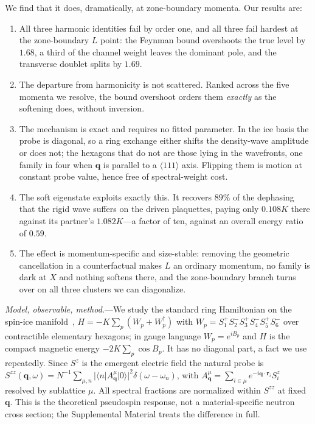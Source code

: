 \documentclass[
aps,prl,twocolumn,amsmath,amssymb,superscriptaddress,
longbibliography,floatfix
]{revtex4-2}
\newcommand{\bq}{\bm q}
\newcommand{\Szz}{S^{zz}}
\begin{document}
We find that it does, dramatically, at zone-boundary momenta. Our results
are:
\begin{enumerate}
\item All three harmonic identities fail by order one, and all three fail
hardest at the zone-boundary $L$ point: the Feynman bound overshoots the
true level by $1.68$, a third of the channel weight leaves the dominant
pole, and the transverse doublet splits by $1.69$.
\item The departure from harmonicity is not scattered. Ranked across the
five momenta we resolve, the bound overshoot orders them \emph{exactly} as
the softening does, without inversion.
\item The mechanism is exact and requires no fitted parameter. In the ice
basis the probe is diagonal, so a ring exchange either shifts the
density-wave amplitude or does not; the hexagons that do not are those
lying in the wavefronts, one family in four when $\bq$ is parallel to a
$\langle111\rangle$ axis. Flipping them is motion at constant probe
value, hence free of spectral-weight cost.
\item The soft eigenstate exploits exactly this. It recovers $89\%$ of the
dephasing that the rigid wave suffers on the driven plaquettes, paying
only $0.108K$ there against its partner's $1.082K$---a factor of ten,
against an overall energy ratio of $0.59$.
\item The effect is momentum-specific and size-stable: removing the
geometric cancellation in a counterfactual makes $L$ an ordinary
momentum, no family is dark at $X$ and nothing softens there, and the
zone-boundary branch turns over on all three clusters we can
diagonalize.
\end{enumerate}

\emph{Model, observable, method.}---We study the standard ring
Hamiltonian on the spin-ice manifold~\cite{Hermele2004,Shannon2012},
$H=-K\sum_p(W_p+W_p^\dagger)$ with
$W_p=S^+_1S^-_2S^+_3S^-_4S^+_5S^-_6$ over contractible elementary
hexagons; in gauge language $W_p=e^{iB_p}$ and $H$ is the compact
magnetic energy $-2K\sum_p\cos B_p$. It has no diagonal part, a fact we
use repeatedly. Since $S^z$ is the emergent electric field the natural
probe is
$\Szz(\bq,\omega)=N^{-1}\sum_{\mu,n}|\langle
n|A^\mu_{\bq}|0\rangle|^2\delta(\omega-\omega_n)$, with
$A^\mu_{\bq}=\sum_{i\in\mu}e^{-i\bq\cdot\bm r_i}S^z_i$ resolved by
sublattice $\mu$. All spectral fractions are normalized within $\Szz$ at
fixed $\bq$. This is the theoretical pseudospin response, not a
material-specific neutron cross section; the Supplemental Material
treats the difference in full.
\end{document}
